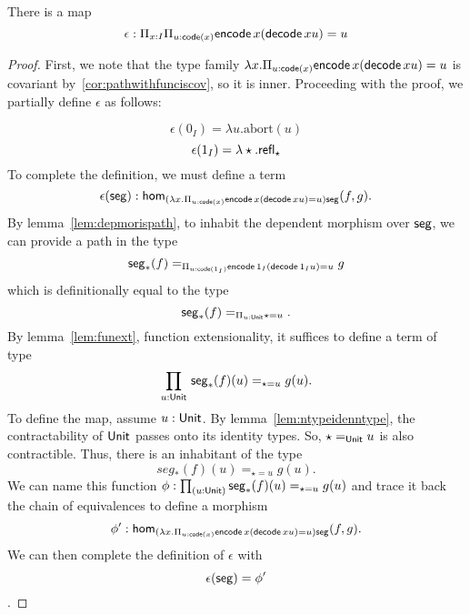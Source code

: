 \documentclass[main.tex]{subfiles}
\begin{document}
\begin{lemma}
    There is a map 
    $$ \epsilon : \Pi_{x : I} \Pi_{u : \co(x)} \normalfont \eco \, x (\dco \, x u) = u$$
\end{lemma}
\begin{proof}
First, we note that the type family $\lambda x.\Pi_{u : \co(x)} \normalfont \eco \, x (\dco \, x u) = u $ is covariant by~\ref{cor:pathwithfunciscov}, so it is inner.
Proceeding with the proof, we partially define $\epsilon$ as follows:

$$\epsilon(0_I) = \lambda u. \text{abort}(u)$$
$$\epsilon(1_I) = \lambda \star. \refl{\star}$$
To complete the definition, we must define a term $$\epsilon(\seg) : \ho[(\lambda x.\Pi_{u : \co(x)} \normalfont \eco \, x (\dco \, x u) = u)\seg]{f}{g}.$$
By lemma~\ref{lem:depmorispath}, to inhabit the dependent morphism over $\seg$, we can provide a path in the type $$\seg_*(f) =_{\Pi_{u : \co(1_I)} \normalfont \eco \, 1_I (\dco \, 1_I u) = u} g$$
which is definitionally equal to the type $$\seg_*(f) =_{\Pi_{u : \Un} \normalfont \star = u}.$$
By lemma~\ref{lem:funext}, function extensionality, it suffices to define a term of type $$\prd{u : \Un}\seg_*(f)(u) =_{\star = u} g(u).$$
To define the map, assume $u : \Un$. By lemma~\ref{lem:ntypeidenntype}, the contractability of $\Un$ passes onto its identity types. So, $\star =_\Un u$ is also contractible. Thus, there is an inhabitant of the type
$$seg_*(f)(u) =_{\star = u} g(u).$$
We can name this function $\phi : \prd{u : \Un}\seg_*(f)(u) =_{\star = u} g(u)$ and trace it back the chain of equivalences to define a morphism
$$\phi' : \ho[(\lambda x.\Pi_{u : \co(x)} \normalfont \eco \, x (\dco \, x u) = u)\seg]{f}{g}.$$ We can then complete the definition of $\epsilon$ with
$$\epsilon(\seg) = \phi'$$.
\end{proof}
\end{document}
